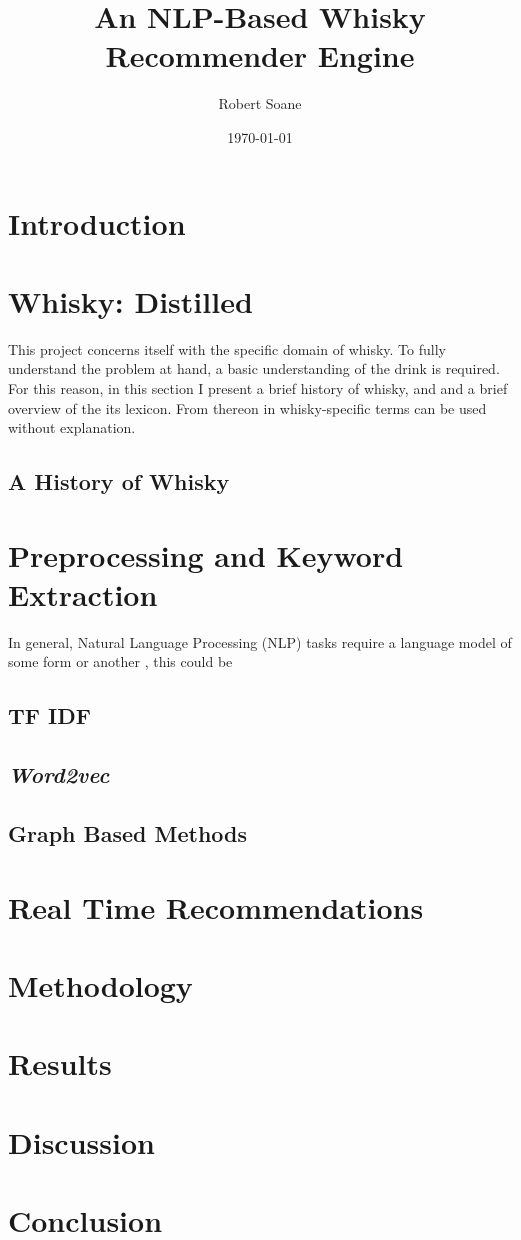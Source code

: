 \documentclass[12pt, a4paper, oneside, notitlepage]{article}
\title{An NLP-Based Whisky Recommender Engine}
\author{Robert Soane}
\date{\today}
\begin{document}
\maketitle
\section{Introduction}\label{sec:intro}

\section{Whisky: Distilled}\label{sec:whisky}
This project concerns itself with the specific domain of whisky. To fully understand the problem at hand, a basic
understanding of the drink is required.  For this reason, in this section I present a brief history of whisky, and 
and a brief overview of the its lexicon. From thereon in whisky-specific terms can be used without explanation.
\subsection{A History of Whisky}
\section{Preprocessing and Keyword Extraction}\label{sec:kwe}
In general, Natural Language Processing (NLP) tasks require a language model of some form or another \cite{Ranjan2016},
this could be 
\subsection{TF IDF}\label{ssec:tfidf}
\subsection{\emph{Word2vec}}
\subsection{Graph Based Methods}
\section{Real Time Recommendations}\label{sec:recommendations}
 
\section{Methodology}\label{sec:meth}
\section{Results}\label{sec:res}
\section{Discussion}\label{sec:disc}
\section{Conclusion}\label{sec:conc}


\end{document}
